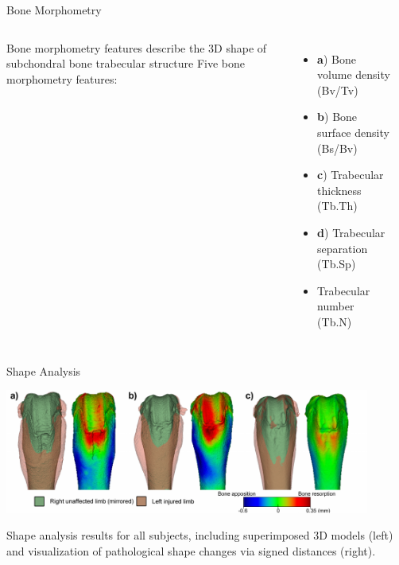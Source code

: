\documentclass[10pt,aspectratio=169]{beamer}
\begin{document}
\begin{frame}{Bone Morphometry}

  \begin{columns}[onlytextwidth]
    Bone morphometry features describe the 3D shape of subchondral bone trabecular structure
    Five bone morphometry features:
    \begin{itemize} \itemsep0.5em
      \item \textbf{a}) Bone volume density (Bv/Tv)
      \item \textbf{b}) Bone surface density (Bs/Bv)
      \item \textbf{c}) Trabecular thickness (Tb.Th)
      \item \textbf{d}) Trabecular separation (Tb.Sp)
      \item Trabecular number (Tb.N)
    \end{itemize}
    \begin{columns}
    \centering
    \centering
    \\
    \centering
    \\
    \end{columns}
  \end{columns}
\end{frame}

\begin{frame}{Shape Analysis}
  \begin{center}
  \includegraphics[width=0.9\textwidth]{./figures/analysis_shape.png}\\
  \end{center}
  \vspace{0.1cm}
  \centering
  Shape analysis results for all subjects, including superimposed 3D models (left) and visualization of pathological shape changes via signed distances (right).
\end{frame}
\end{document}
